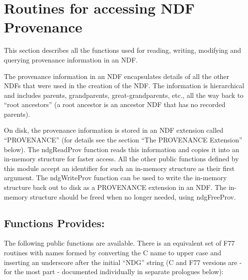 \documentclass[twoside,11pt]{article}
\renewcommand{\_}{\texttt{\symbol{95}}}
\begin{document}
\newpage

\section{Routines for accessing NDF Provenance}

This section describes all the functions used for reading, writing,
modifying and querying provenance information in an NDF.

The provenance information in an NDF encapsulates details of all the
other NDFs that were used in the creation of the NDF. The information is
hierarchical and includes parents, grandparents, great-grandparents,
etc., all the way back to ``root ancestors'' (a root ancestor is an ancestor
NDF that has no recorded parents).

On disk, the provenance information is stored in an NDF extension called
``PROVENANCE'' (for details see the section ``The PROVENANCE Extension''
below). The ndgReadProv function reads this information and copies it
into an in-memory structure for faster access. All the other public
functions defined by this module accept an identifier for such an
in-memory structure as their first argument. The ndgWriteProv function
can be used to write the in-memory structure back out to disk as a
PROVENANCE extension in an NDF. The in-memory structure should be freed
when no longer needed, using ndgFreeProv.

\subsection{Functions Provides:}
The following public functions are available. There is an equivalent set
of F77 routines with names formed by converting the C name to upper case
and inserting an underscore after the initial ``NDG'' string (C and F77
versions are - for the most part - documented individually in separate
prologues below):
\end{document}
